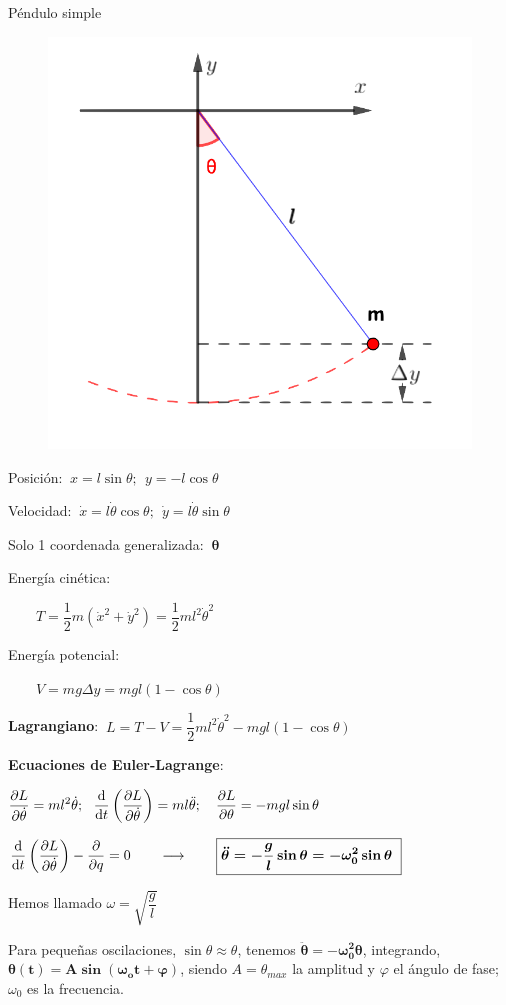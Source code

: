\begin{myexampleblock}{Péndulo simple}
\begin{multicols}{2}
	\begin{figure}[H]
		\centering
		\includegraphics[width=.35\textwidth]{imagenes/img03-04.png}
		\end{figure}
		\vspace{2mm} Posición: $\ x=l\sin \theta; \ \ y=-l\cos \theta$
		
		\vspace{2mm} Velocidad: $\ \dot x=l \dot \theta \cos \theta; \ \ \dot y=l\dot \theta \sin \theta$
		
		\vspace{2mm} Solo 1 coordenada generalizada: $\ \boldsymbol \theta$
		
		\vspace{2mm} Energía cinética: 
		
		$\qquad T = \dfrac 1 2 m (\dot x^2+\dot y^2)= \dfrac 1 2 m l^2 \dot \theta ^2$
		
		\vspace{3mm} Energía potencial: 
		
		$\qquad V=mg\Delta y= mgl(1-\cos \theta)$	
\end{multicols}

\vspace{3mm} \textbf{Lagrangiano}: $\ L=T-V=\dfrac 1 2 ml^2\dot \theta^2 -mgl(1-\cos \theta)$
	
\vspace{3mm}\textbf{Ecuaciones de Euler-Lagrange}:

\vspace{2mm} $\displaystyle \pdv{L}{\dot \theta}=ml^2 \dot \theta; \ \ \dv{t}\left( \pdv{L}{\dot \theta} \right)=ml\ddot \theta; \quad \pdv{L}{\theta}=-mgl \sin \theta$

\vspace{2mm} $\displaystyle \dv{t}\left( \pdv{L}{\dot \theta} \right)-\pdv{ }{q}=0 \qquad \longrightarrow \qquad  \boldsymbol{ \boxed{ \ddot \theta = -\dfrac g l \sin \theta = -\omega_0^2 \sin \theta \ } } $

\vspace{2mm}Hemos llamado $\omega=\sqrt{\dfrac g l}$

\vspace{3mm} Para pequeñas oscilaciones, $\sin \theta \approx \theta$, tenemos $\boldsymbol{\ddot \theta=-\omega_0^2 \theta}$, integrando, $\boldsymbol{\theta(t)=A \sin(\omega_o t+\varphi)}$, siendo $A=\theta_{max}$ la amplitud y $\varphi$ el ángulo de fase; $\omega_0$ es la frecuencia. 
\end{myexampleblock}



